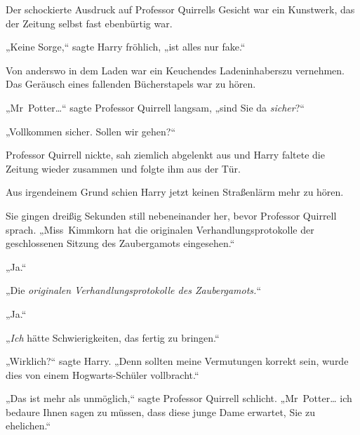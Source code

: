 Der schockierte Ausdruck auf Professor Quirrells Gesicht war ein Kunstwerk, das der Zeitung selbst fast ebenbürtig war.

„Keine Sorge,“ sagte Harry fröhlich, „ist alles nur fake.“

Von anderswo in dem Laden war ein Keuchendes Ladeninhaberszu vernehmen. Das Geräusch eines fallenden Bücherstapels war zu hören.

„Mr~Potter…“ sagte Professor Quirrell langsam, „sind Sie da \emph{sicher}?“

„Vollkommen sicher. Sollen wir gehen?“

Professor Quirrell nickte, sah ziemlich abgelenkt aus und Harry faltete die Zeitung wieder zusammen und folgte ihm aus der Tür.

Aus irgendeinem Grund schien Harry jetzt keinen Straßenlärm mehr zu hören.

Sie gingen dreißig Sekunden still nebeneinander her, bevor Professor Quirrell sprach. „Miss~Kimmkorn hat die originalen Verhandlungsprotokolle der geschlossenen Sitzung des Zaubergamots eingesehen.“

„Ja.“

„Die \emph{originalen Verhandlungsprotokolle des Zaubergamots.}“

„Ja.“

„\emph{Ich} hätte Schwierigkeiten, das fertig zu bringen.“

„Wirklich?“ sagte Harry. „Denn sollten meine Vermutungen korrekt sein, wurde dies von einem Hogwarts-Schüler vollbracht.“

„Das ist mehr als unmöglich,“ sagte Professor Quirrell schlicht. „Mr~Potter… ich bedaure Ihnen sagen zu müssen, dass diese junge Dame erwartet, Sie zu ehelichen.“

